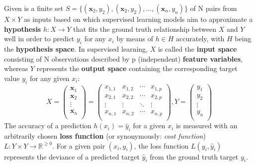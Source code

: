 Given is a finite set $ S = \{(\textbf{x}_{2}, y_2), (\textbf{x}_{2}, y_2), \dots, (\textbf{x}_{n}, y_n)\}$ of N pairs from $ X \times Y $ as inputs based on which supervised learning models aim to approximate a \textbf{hypothesis} $ h: X \to Y $  that fits the ground truth relationship between $ X $ and $ Y $ well in order to predict $ y_i $ for any $ x_i $ by means of $ h \in H $ accurately, with $ H $ being the \textbf{hypothesis space}. In supervised learning, $ X $ is called the \textbf{input space} consisting of N observations described by p (independent) \textbf{feature variables}, whereas $ Y $ represents the \textbf{output space} containing the corresponding target value $ y_i $ for any given $ x_i $:   
\begin{equation*}
X = 
\begin{pmatrix}
\textbf{x}_{1} \\
\textbf{x}_{2} \\
\vdots \\
\textbf{x}_{n} \\
\end{pmatrix} 
=
\begin{pmatrix}
x_{1,1} & x_{1,2} & \cdots & x_{1,p} \\
x_{2,1} & x_{2,2} & \cdots & x_{2,p} \\
\vdots  & \vdots  & \ddots & \vdots \\
x_{n,1} & x_{n,2} & \cdots & x_{n,p} \\
\end{pmatrix}
,
Y = 
\begin{pmatrix}
y_{1} \\
y_{2} \\
\vdots \\
y_{n} \\
\end{pmatrix}
\end{equation*}
The accuracy of a prediction $ h(x_i) = \hat{y}_{i} $ for a given $ x_i $ is measured with an arbitrarily chosen \textbf{loss function} (or synonymously: \textit{cost function}) $ L : Y \times Y \to \mathbb{R}^{\geq 0}$. 
For a given pair $ (x_i, y_i) $, the loss function $ L(y_i, \hat{y}_i) $ represents the deviance of a predicted target $ \hat{y}_{i} $ from the ground truth target $ y_i $.


